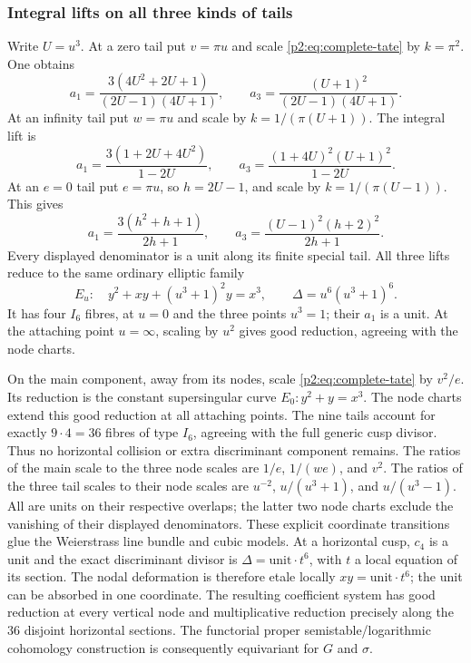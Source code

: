 \subsubsection{Integral lifts on all three kinds of tails}
Write $U=u^3$. At a zero tail put $v=\pi u$ and scale
\eqref{p2:eq:complete-tate} by $k=\pi^2$. One obtains
\[
a_1=\frac{3(4U^2+2U+1)}{(2U-1)(4U+1)},\qquad
a_3=\frac{(U+1)^2}{(2U-1)(4U+1)}.
\]
At an infinity tail put $w=\pi u$ and scale by
$k=1/(\pi(U+1))$. The integral lift is
\[
a_1=\frac{3(1+2U+4U^2)}{1-2U},\qquad
a_3=\frac{(1+4U)^2(U+1)^2}{1-2U}.
\]
At an $e=0$ tail put $e=\pi u$, so $h=2U-1$, and scale by
$k=1/(\pi(U-1))$. This gives
\[
a_1=\frac{3(h^2+h+1)}{2h+1},\qquad
a_3=\frac{(U-1)^2(h+2)^2}{2h+1}.
\]
Every displayed denominator is a unit along its finite special tail.
All three lifts reduce to the same ordinary elliptic family
\begin{equation}\label{p2:eq:common-tail}
E_u:\quad y^2+xy+(u^3+1)^2y=x^3,
\qquad \Delta=u^6(u^3+1)^6.
\end{equation}
It has four $I_6$ fibres, at $u=0$ and the three points $u^3=1$;
their $a_1$ is a unit. At the attaching point $u=\infty$, scaling by
$u^2$ gives good reduction, agreeing with the node charts.

On the main component, away from its nodes, scale
\eqref{p2:eq:complete-tate} by $v^2/e$. Its reduction is the constant
supersingular curve $E_0:y^2+y=x^3$. The node charts extend this good
reduction at all attaching points. The nine tails account for exactly
$9\cdot4=36$ fibres of type $I_6$, agreeing with the full generic cusp
divisor. Thus no horizontal collision or extra discriminant component
remains. The ratios of the main scale to the three node scales are
$1/e$, $1/(we)$, and $v^2$. The ratios of the three tail scales to
their node scales are $u^{-2}$, $u/(u^3+1)$, and $u/(u^3-1)$.
All are units on their respective overlaps; the latter two node charts
exclude the vanishing of their displayed denominators. These explicit
coordinate transitions glue the Weierstrass line bundle and cubic models.
At a horizontal cusp, $c_4$ is a unit and the exact discriminant divisor
is $\Delta=\text{unit}\cdot t^6$, with $t$ a local equation of its
section. The nodal deformation is therefore etale locally
$xy=\text{unit}\cdot t^6$; the unit can be absorbed in one coordinate.
The resulting
coefficient system has good reduction at every vertical node and
multiplicative reduction precisely along the 36 disjoint horizontal
sections. The functorial proper semistable/logarithmic cohomology
construction is consequently equivariant for $G$ and $\sigma$.

